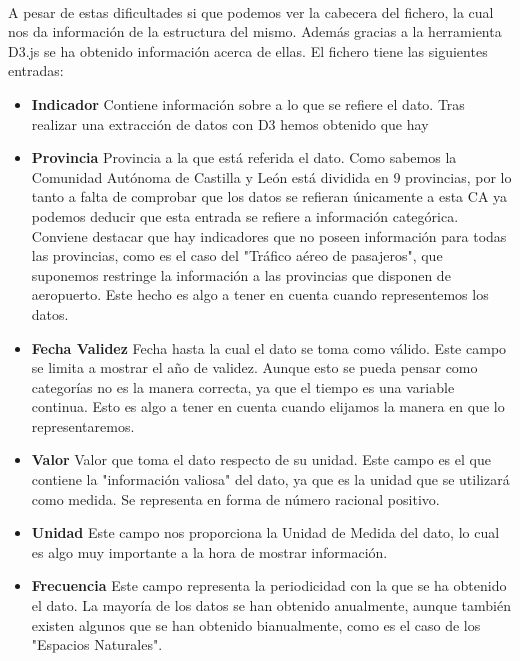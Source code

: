 \documentclass{article}
\begin{document}
			\paragraph{}
			A pesar de estas dificultades si que podemos ver la cabecera del fichero, la cual nos da información de la estructura del mismo. Además gracias a la herramienta D3.js se ha obtenido información acerca de ellas. El fichero tiene las siguientes entradas:
	
			\begin{itemize}
			
				\item {\bf Indicador } Contiene información sobre a lo que se refiere el dato. Tras realizar una extracción de datos con D3 hemos obtenido que hay 

				\item {\bf Provincia } Provincia a la que está referida el dato. Como sabemos la Comunidad Autónoma de Castilla y León está dividida en 9 provincias, por lo tanto a falta de comprobar que los datos se refieran únicamente a esta CA ya podemos deducir que esta entrada se refiere a información categórica. Conviene destacar que hay indicadores que no poseen información para todas las provincias, como es el caso del "Tráfico aéreo de pasajeros", que suponemos restringe la información a las provincias que disponen de aeropuerto. Este hecho es algo a tener en cuenta cuando representemos los datos.

				\item {\bf Fecha Validez } Fecha hasta la cual el dato se toma como válido. Este campo se limita a mostrar el año de validez. Aunque esto se pueda pensar como categorías no es la manera correcta, ya que el tiempo es una variable continua. Esto es algo a tener en cuenta cuando elijamos la manera en que lo representaremos.

				\item {\bf Valor } Valor que toma el dato respecto de su unidad. Este campo es el que contiene la "información valiosa" del dato, ya que es la unidad que se utilizará como medida. Se representa en forma de número racional positivo.

				\item {\bf Unidad } Este campo nos proporciona la Unidad de Medida del dato, lo cual es algo muy importante a la hora de mostrar información.

				\item {\bf Frecuencia } Este campo representa la periodicidad con la que se ha obtenido el dato. La mayoría de los datos se han obtenido anualmente, aunque también existen algunos que se han obtenido bianualmente, como es el caso de los "Espacios Naturales".
			
			\end{itemize}
			
\end{document}
